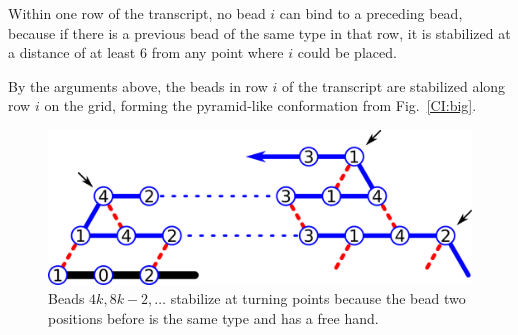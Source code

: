 Within one row of the transcript, no bead $i$ can bind to a preceding bead, because if there is a previous bead of the same type in that row, it is stabilized at a distance of at least $6$ from any point where $i$ could be placed.

By the arguments above, the beads in row $i$ of the transcript are stabilized along row $i$ on the grid, forming the pyramid-like conformation from Fig.~\ref{CI:big}.


\begin{figure}[tb]
	\centering
	\includegraphics[width=0.7\linewidth]{./Fig/CI_turnn}
	\caption{Beads $4k, 8k-2, \dots$ stabilize at turning points because the bead two positions before is the same type and has a free hand.}
	\label{CI:turn}
\end{figure}



